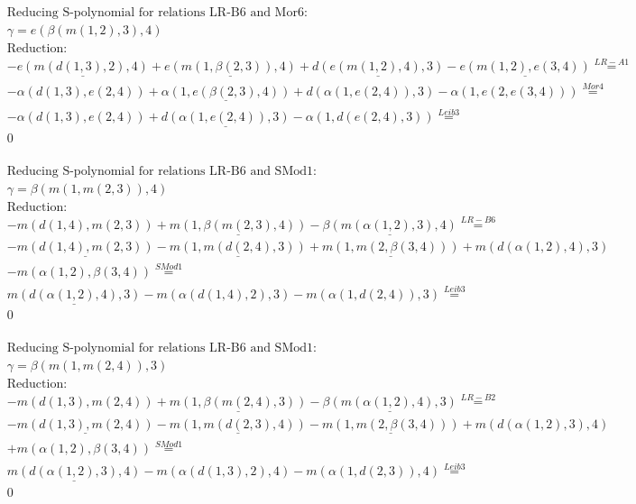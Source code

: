 \documentclass[11pt]{amsart}
\begin{document}
\begin{align*} 
& \text{Reducing S-polynomial for relations LR-B6 and Mor6:} \\ 
& \gamma = e(\beta(m(1,2),3),4) \\ 
& \text{Reduction}: \\& - \underline{e(m(d(1,3),2),4)} + \underline{e(m(1,\beta(2,3)),4)} + \underline{d(e(m(1,2),4),3)} - \underline{e(m(1,2),e(3,4))} \stackrel{ LR-A1 }{=}  \\ 
& - \alpha(d(1,3),e(2,4)) + \underline{\alpha(1,e(\beta(2,3),4))} + d(\alpha(1,e(2,4)),3) - \alpha(1,e(2,e(3,4))) \stackrel{ Mor4 }{=}  \\ 
& - \alpha(d(1,3),e(2,4)) + \underline{d(\alpha(1,e(2,4)),3)} - \alpha(1,d(e(2,4),3)) \stackrel{ Leib3 }{=}  \\ 
&0\\ 
\end{align*} 
 
\begin{align*} 
& \text{Reducing S-polynomial for relations LR-B6 and SMod1:} \\ 
& \gamma = \beta(m(1,m(2,3)),4) \\ 
& \text{Reduction}: \\& - m(d(1,4),m(2,3)) + \underline{m(1,\beta(m(2,3),4))} - \underline{\beta(m(\alpha(1,2),3),4)} \stackrel{ LR-B6 }{=}  \\ 
& - \underline{m(d(1,4),m(2,3))} - \underline{m(1,m(d(2,4),3))} + \underline{m(1,m(2,\beta(3,4)))} + m(d(\alpha(1,2),4),3)\\ 
 &  - m(\alpha(1,2),\beta(3,4)) \stackrel{ SMod1 }{=}  \\ 
&\underline{m(d(\alpha(1,2),4),3)} - m(\alpha(d(1,4),2),3) - m(\alpha(1,d(2,4)),3) \stackrel{ Leib3 }{=}  \\ 
&0\\ 
\end{align*} 
 
\begin{align*} 
& \text{Reducing S-polynomial for relations LR-B6 and SMod1:} \\ 
& \gamma = \beta(m(1,m(2,4)),3) \\ 
& \text{Reduction}: \\& - m(d(1,3),m(2,4)) + \underline{m(1,\beta(m(2,4),3))} - \underline{\beta(m(\alpha(1,2),4),3)} \stackrel{ LR-B2 }{=}  \\ 
& - \underline{m(d(1,3),m(2,4))} - \underline{m(1,m(d(2,3),4))} - \underline{m(1,m(2,\beta(3,4)))} + m(d(\alpha(1,2),3),4)\\ 
 &  + m(\alpha(1,2),\beta(3,4)) \stackrel{ SMod1 }{=}  \\ 
&\underline{m(d(\alpha(1,2),3),4)} - m(\alpha(d(1,3),2),4) - m(\alpha(1,d(2,3)),4) \stackrel{ Leib3 }{=}  \\ 
&0\\ 
\end{align*} 
 
\end{document}
